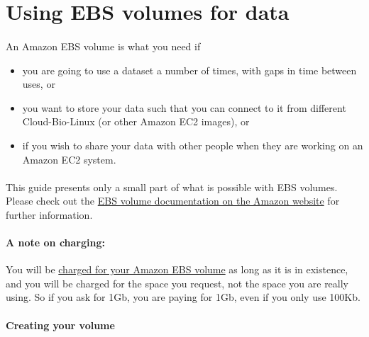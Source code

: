 \section{Using EBS volumes for data}

\paragraph{}An Amazon EBS volume is what you need if 
\begin{itemize}
\item you are going to use a dataset a number of times, with gaps in time between uses, or
\item you want to store your data such that you can connect to it from different Cloud-Bio-Linux (or other Amazon EC2 images), or
\item if you wish to share your data with other people when they are working on an Amazon EC2 system.
\end{itemize}

\paragraph{}This guide presents only a small part of what is possible with EBS volumes. Please check out the \href{http://docs.amazonwebservices.com/AWSEC2/latest/UserGuide/ebs-api-overview.html}{EBS volume documentation on the Amazon website} for further information.

\paragraph{A note on charging:}You will be \href{http://aws.amazon.com/ec2/}{charged for your Amazon EBS volume} as long as it is in existence, and you will be charged for the space you request, not the space you are really using. So if you ask for 1Gb, you are paying for 1Gb, even if you only use 100Kb. 

\paragraph{Creating your volume}

